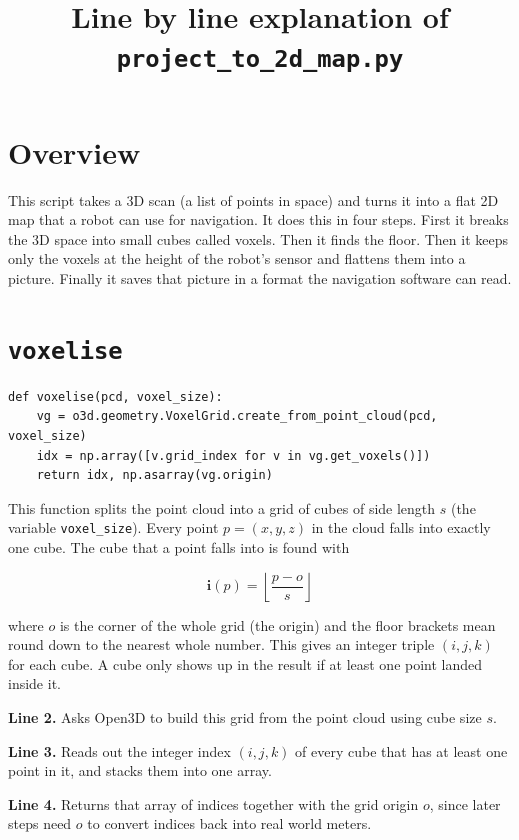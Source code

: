 \documentclass[11pt]{article}
\title{Line by line explanation of \texttt{project\_to\_2d\_map.py}}
\author{}
\date{}
\begin{document}
\maketitle

\section*{Overview}

This script takes a 3D scan (a list of points in space) and turns it into a flat 2D map that a robot can use for navigation. It does this in four steps. First it breaks the 3D space into small cubes called voxels. Then it finds the floor. Then it keeps only the voxels at the height of the robot's sensor and flattens them into a picture. Finally it saves that picture in a format the navigation software can read.

\section{\texttt{voxelise}}

\begin{lstlisting}
def voxelise(pcd, voxel_size):
    vg = o3d.geometry.VoxelGrid.create_from_point_cloud(pcd, voxel_size)
    idx = np.array([v.grid_index for v in vg.get_voxels()])
    return idx, np.asarray(vg.origin)
\end{lstlisting}

This function splits the point cloud into a grid of cubes of side length $s$ (the variable \texttt{voxel\_size}). Every point $p = (x, y, z)$ in the cloud falls into exactly one cube. The cube that a point falls into is found with

\[
\mathbf{i}(p) = \left\lfloor \frac{p - o}{s} \right\rfloor
\]

where $o$ is the corner of the whole grid (the origin) and the floor brackets mean round down to the nearest whole number. This gives an integer triple $(i, j, k)$ for each cube. A cube only shows up in the result if at least one point landed inside it.

\textbf{Line 2.} Asks Open3D to build this grid from the point cloud using cube size $s$.

\textbf{Line 3.} Reads out the integer index $(i, j, k)$ of every cube that has at least one point in it, and stacks them into one array.

\textbf{Line 4.} Returns that array of indices together with the grid origin $o$, since later steps need $o$ to convert indices back into real world meters.
\end{document}
